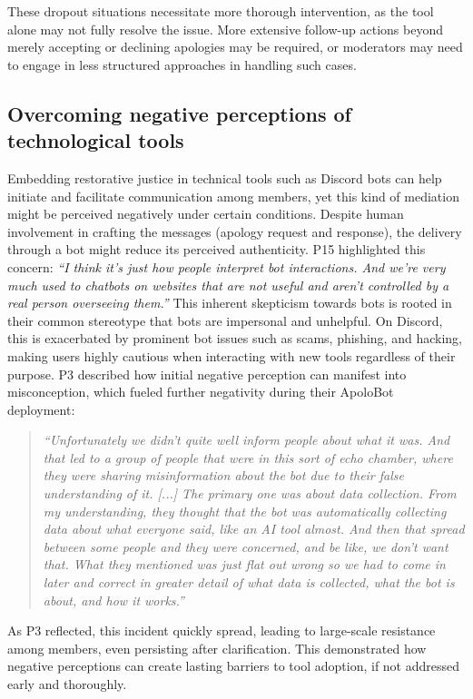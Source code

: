 These dropout situations necessitate more thorough intervention, as the tool alone may not fully resolve the issue. More extensive follow-up actions beyond merely accepting or declining apologies may be required, or moderators may need to engage in less structured approaches in handling such cases.

\subsection{Overcoming negative perceptions of technological tools} \label{challenge-perception}
Embedding restorative justice in technical tools such as Discord bots can help initiate and facilitate communication among members, yet this kind of mediation might be perceived negatively under certain conditions. Despite human involvement in crafting the messages (apology request and response), the delivery through a bot might reduce its perceived authenticity. P15 highlighted this concern: \textit{``I think it's just how people interpret bot interactions. And we're very much used to chatbots on websites that are not useful and aren't controlled by a real person overseeing them.''} This inherent skepticism towards bots is rooted in their common stereotype that bots are impersonal and unhelpful. On Discord, this is exacerbated by prominent bot issues such as scams, phishing, and hacking, making users highly cautious when interacting with new tools regardless of their purpose. P3 described how initial negative perception can manifest into misconception, which fueled further negativity during their ApoloBot deployment:
\begin{quote}
    \textit{``Unfortunately we didn't quite well inform people about what it was. And that led to a group of people that were in this sort of echo chamber, where they were sharing misinformation about the bot due to their false understanding of it. [...] The primary one was about data collection. From my understanding, they thought that the bot was automatically collecting data about what everyone said, like an AI tool almost. And then that spread between some people and they were concerned, and be like, we don't want that. What they mentioned was just flat out wrong so we had to come in later and correct in greater detail of what data is collected, what the bot is about, and how it works.''}
\end{quote}
As P3 reflected, this incident quickly spread, leading to large-scale resistance among members, even persisting after clarification. This demonstrated how negative perceptions can create lasting barriers to tool adoption, if not addressed early and thoroughly.

